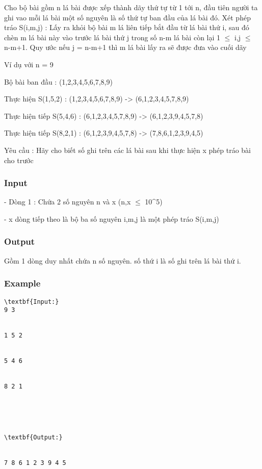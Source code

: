 



   Cho bộ bài gồm n lá bài được xếp thành dãy thứ tự từ 1 tới n, đầu tiên người ta ghi vao mỗi lá bài một số nguyên là số thứ tự ban đầu của lá bài đó. Xét phép tráo S(i,m,j) : Lấy ra khỏi bộ bài m lá liên tiếp bắt đầu từ lá bài thứ i, sau đó chèn m lá bài này vào trước lá bài thứ j trong số n-m lá bài còn lại 1 $\le$ i,j $\le$ n-m+1. Quy ước nếu j = n-m+1 thì m lá bài lấy ra sẽ được đưa vào cuối dãy  

   Ví dụ với n = 9  

   Bộ bài ban đầu : (1,2,3,4,5,6,7,8,9)  

   Thực hiện S(1,5,2) : (1,2,3,4,5,6,7,8,9) -> (6,1,2,3,4,5,7,8,9)  

   Thực hiện tiếp S(5,4,6) : (6,1,2,3,4,5,7,8,9) -> (6,1,2,3,9,4,5,7,8)  

   Thực hiện tiếp S(8,2,1) : (6,1,2,3,9,4,5,7,8) -> (7,8,6,1,2,3,9,4,5)  

   Yêu cầu : Hãy cho biết số ghi trên các lá bài sau khi thực hiện x phép tráo bài cho trước  

\subsubsection{   Input  }

   - Dòng 1 : Chứa 2 số nguyên n và x (n,x  $\le$  10^5)  

   - x dòng tiếp theo là bộ ba số nguyên i,m,j là một phép tráo S(i,m,j)  

\subsubsection{   Output  }

   Gồm 1 dòng duy nhất chứa n số nguyên. số thứ i là số ghi trên lá bài thứ i.  

\subsubsection{   Example  }
\begin{verbatim}
\textbf{Input:}
9 3


1 5 2


5 4 6


8 2 1





\textbf{Output:}


7 8 6 1 2 3 9 4 5 \end{verbatim}
